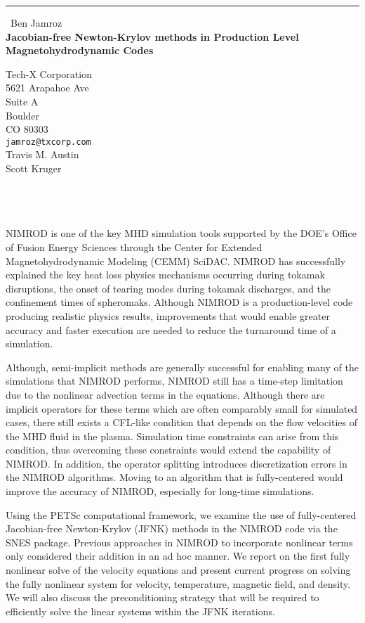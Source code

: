 \documentclass{report}
\begin{document}
\begin{center}
\rule{6in}{1pt} \
{\large Ben Jamroz \\
{\bf  Jacobian-free Newton-Krylov methods in Production Level Magnetohydrodynamic Codes}}

Tech-X Corporation \\ 5621 Arapahoe Ave \\ Suite A \\ Boulder \\ CO 80303
\\
{\tt jamroz@txcorp.com}\\
Travis M. Austin\\
Scott Kruger\\
   \\
   \\
   \\
   \end{center}

NIMROD is one of the key MHD simulation tools supported by the DOE's
Office of Fusion Energy Sciences through the Center for Extended
Magnetohydrodynamic Modeling (CEMM) SciDAC. NIMROD has successfully
explained the key heat loss physics mechanisms occurring during tokamak
disruptions, the onset of tearing modes during tokamak discharges, and
the confinement times of spheromaks. Although NIMROD is a
production-level code producing realistic physics results, improvements
that would enable greater accuracy and faster execution are needed to
reduce the turnaround time of a simulation.

Although, semi-implicit methods are generally successful for enabling
many of the simulations that NIMROD performs, NIMROD still has a
time-step limitation due to the nonlinear advection terms in the
equations. Although there are implicit operators for these terms which
are often comparably small for simulated cases, there still exists a
CFL-like condition that depends on the flow velocities of the MHD fluid
in the plasma. Simulation time constraints can arise from this condition,
thus overcoming these constraints would extend the capability of NIMROD.
In addition, the operator splitting introduces discretization errors in
the NIMROD algorithms. Moving to an algorithm that is fully-centered
would improve the accuracy of NIMROD, especially for long-time
simulations.

Using the PETSc computational framework, we examine the use of
fully-centered Jacobian-free Newton-Krylov (JFNK) methods in the NIMROD
code via the SNES package. Previous approaches in NIMROD to incorporate
nonlinear terms only considered their addition in an ad hoc manner. We
report on the first fully nonlinear solve of the velocity equations and
present current progress on solving the fully nonlinear system for
velocity, temperature, magnetic field, and density. We will also discuss
the preconditioning strategy that will be required to efficiently solve
the linear systems within the JFNK iterations.
\end{document}
